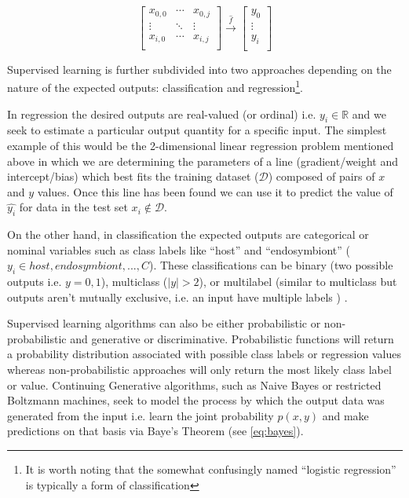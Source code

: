 \[
    \begin{bmatrix}
        x_{0,0} & \cdots & x_{0,j}\\
        \vdots & \ddots & \vdots \\
        x_{i,0} & \cdots & x_{i,j}\\
    \end{bmatrix} \overset{\hat{f}}{\rightarrow} \begin{bmatrix}
        y_{0} \\
        \vdots \\
        y_{i} \\
    \end{bmatrix}
    \label{eq:sup}
\]

Supervised learning is further subdivided into two approaches depending on the nature of the expected
outputs: classification and regression\footnote{It is worth noting that the somewhat confusingly named
    ``logistic regression'' is typically a form of classification}.

In regression the desired outputs are real-valued (or ordinal) i.e. \(y_{i} \in \mathbb{R}\) and we seek to
estimate a particular output quantity for a specific input.
The simplest example of this would be the 2-dimensional linear regression problem mentioned above in which
we are determining the parameters of a line (gradient/weight and intercept/bias) which best fits the training 
dataset (\(\mathcal{D}\)) composed of pairs of \(x\) and \(y\) values.  Once this line has been found we 
can use it to predict the value of \(\hat{y_{i}}\) for data in the test set \(x_{i} \not \in \mathcal{D}\).


On the other hand, in classification the expected outputs are 
categorical or nominal variables such as class labels like ``host'' and ``endosymbiont'' 
(\(y_{i} \in {host, endosymbiont, ..., C}\)).  These classifications can be binary (two possible outputs i.e. 
\(y={0,1}\)), multiclass (\(\left\vert{{y}}\right\vert > 2\)),
or multilabel (similar to multiclass but outputs aren't mutually exclusive, i.e. an input have multiple labels
) \citep{Murphy2012}. 

Supervised learning algorithms can also be either probabilistic or non-probabilistic and generative or 
discriminative.
Probabilistic functions will return a probability distribution associated with possible class labels or
regression values whereas non-probabilistic approaches will only return the most likely class label or value.
Continuing 
Generative algorithms, such as Naive Bayes or restricted Boltzmann machines, 
seek to model the process by which the output data was generated 
from the input i.e. learn the joint probability \(p(x,y)\) and make predictions on that basis via Baye's Theorem (see \ref{eq:bayes}).

